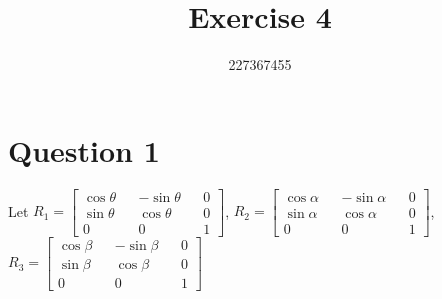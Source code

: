 \documentclass{article}
\begin{document}
    \title{Exercise 4}
    \author{227367455}
    \date{}
    \maketitle

    \section*{Question 1}

    Let $R_1 = \begin{bmatrix}
        \cos \theta && - \sin \theta && 0 \\ 
        \sin \theta && \cos \theta && 0 \\
        0  && 0  && 1
    \end{bmatrix}$, 
    $R_2 = \begin{bmatrix}
        \cos \alpha && - \sin \alpha && 0  \\ 
        \sin \alpha && \cos \alpha && 0 \\
        0  && 0  && 1

    \end{bmatrix}$,
    $R_3 = \begin{bmatrix}
        \cos \beta && - \sin \beta && 0  \\ 
        \sin \beta && \cos \beta && 0 \\
        0  && 0  && 1

    \end{bmatrix}$
\end{document}
